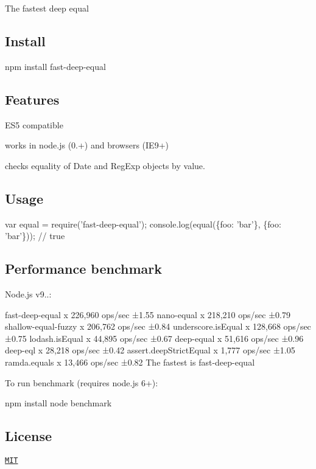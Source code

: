 The fastest deep equal

\href{https://travis-ci.org/epoberezkin/fast-deep-equal}{\tt } \href{http://badge.fury.io/js/fast-deep-equal}{\tt } \href{https://coveralls.io/github/epoberezkin/fast-deep-equal?branch=master}{\tt }

\subsection*{Install}


\begin{DoxyCode}
npm install fast-deep-equal
\end{DoxyCode}


\subsection*{Features}


\begin{DoxyItemize}
\item E\+S5 compatible
\item works in node.\+js (0.+) and browsers (I\+E9+)
\item checks equality of Date and Reg\+Exp objects by value.
\end{DoxyItemize}

\subsection*{Usage}


\begin{DoxyCode}
var equal = require('fast-deep-equal');
console.log(equal(\{foo: 'bar'\}, \{foo: 'bar'\})); // true
\end{DoxyCode}


\subsection*{Performance benchmark}

Node.\+js v9..\+:


\begin{DoxyCode}
fast-deep-equal x 226,960 ops/sec ±1.55%
nano-equal x 218,210 ops/sec ±0.79%
shallow-equal-fuzzy x 206,762 ops/sec ±0.84%
underscore.isEqual x 128,668 ops/sec ±0.75%
lodash.isEqual x 44,895 ops/sec ±0.67%
deep-equal x 51,616 ops/sec ±0.96%
deep-eql x 28,218 ops/sec ±0.42%
assert.deepStrictEqual x 1,777 ops/sec ±1.05%
ramda.equals x 13,466 ops/sec ±0.82%
The fastest is fast-deep-equal
\end{DoxyCode}


To run benchmark (requires node.\+js 6+)\+:


\begin{DoxyCode}
npm install
node benchmark
\end{DoxyCode}


\subsection*{License}

\href{https://github.com/epoberezkin/fast-deep-equal/blob/master/LICENSE}{\tt M\+IT} 